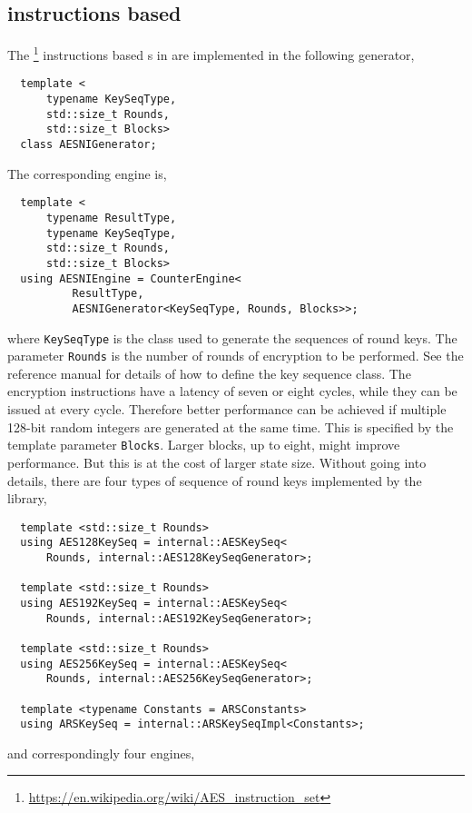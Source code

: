 \subsection{\protect\aesni instructions based \protect\rng}
\label{sub:AES-NI instructions based RNG}

The \aesni\footnote{\url{https://en.wikipedia.org/wiki/AES_instruction_set}}
instructions based \rng{}s in \textcite{Salmon:2011um} are implemented in the
following generator,
\begin{Verbatim}
  template <
      typename KeySeqType,
      std::size_t Rounds,
      std::size_t Blocks>
  class AESNIGenerator;
\end{Verbatim}
The corresponding \rng engine is,
\begin{Verbatim}
  template <
      typename ResultType,
      typename KeySeqType,
      std::size_t Rounds,
      std::size_t Blocks>
  using AESNIEngine = CounterEngine<
          ResultType,
          AESNIGenerator<KeySeqType, Rounds, Blocks>>;
\end{Verbatim}
where \verb|KeySeqType| is the class used to generate the sequences of round
keys. The parameter \verb|Rounds| is the number of rounds of \aes encryption to
be performed. See the reference manual for details of how to define the key
sequence class. The \aesni encryption instructions have a latency of seven or
eight cycles, while they can be issued at every cycle. Therefore better
performance can be achieved if multiple 128-bit random integers are generated
at the same time. This is specified by the template parameter \verb|Blocks|.
Larger blocks, up to eight, might improve performance. But this is at the cost
of larger state size. Without going into details, there are four types of
sequence of round keys implemented by the library,
\begin{Verbatim}
  template <std::size_t Rounds>
  using AES128KeySeq = internal::AESKeySeq<
      Rounds, internal::AES128KeySeqGenerator>;

  template <std::size_t Rounds>
  using AES192KeySeq = internal::AESKeySeq<
      Rounds, internal::AES192KeySeqGenerator>;

  template <std::size_t Rounds>
  using AES256KeySeq = internal::AESKeySeq<
      Rounds, internal::AES256KeySeqGenerator>;

  template <typename Constants = ARSConstants>
  using ARSKeySeq = internal::ARSKeySeqImpl<Constants>;
\end{Verbatim}
and correspondingly four \rng engines,
